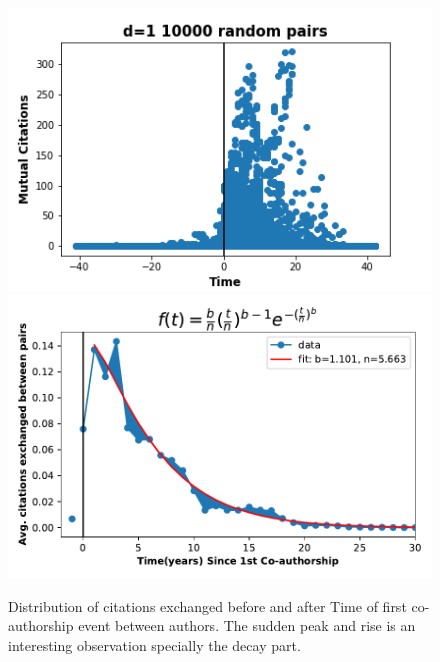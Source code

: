\documentclass[aps, pre, twocolumn, nofootinbib]{revtex4-1}
\begin{document}
\begin{figure}[htbp]  
	\centering
	
	\includegraphics[scale = 0.49]{plots/d1}
	\includegraphics[scale = 0.49]{plots/aging_in_colab}
		
\captionsetup{singlelinecheck=false, justification=raggedright,  labelsep=space}
\caption{Distribution of citations exchanged before and after Time of first co-authorship event between authors. The sudden peak and rise is an interesting observation specially the decay part.}
   \label{f4}
\end{figure}
\end{document}
